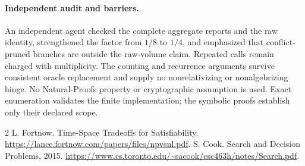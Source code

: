 \documentclass[11pt]{article}
\begin{document}
\paragraph{Independent audit and barriers.}
An independent agent checked the complete aggregate reports and the raw
identity, strengthened the factor from $1/8$ to $1/4$, and emphasized
that conflict-pruned branches are outside the raw-volume claim. Repeated
calls remain charged with multiplicity. The counting and recurrence
arguments survive consistent oracle replacement and supply no
nonrelativizing or nonalgebrizing hinge. No Natural-Proofs property or
cryptographic assumption is used. Exact enumeration validates the finite
implementation; the symbolic proofs establish only their declared scope.

\begin{thebibliography}{2}
 L. Fortnow. Time-Space Tradeoffs for Satisfiability.
\url{https://lance.fortnow.com/papers/files/npvsnl.pdf}.
 S. Cook. Search and Decision Problems, 2015.
\url{https://www.cs.toronto.edu/~sacook/csc463h/notes/Search.pdf}.
\end{thebibliography}
\end{document}
